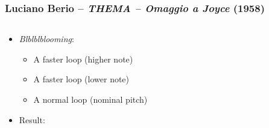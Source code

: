 \begin{frame}
    \frametitle{\normalsize Luciano Berio -- \emph{THEMA -- Omaggio a Joyce} (1958)} 

    \begin{columns}[T]
        \begin{column}{0.7\textwidth}
          \begin{itemize}
							\item \alert{\emph{Blblblblooming}:}
      
                  \begin{itemize}
											\item \alert{A faster loop (higher note)}
											\item \alert{A faster loop (lower note)}
											\item \alert{A normal loop (nominal pitch)}
                  \end{itemize}
      
					\item \alert{Result:} 
      
          \end{itemize}
        \end{column}
        \begin{column}{0.3\textwidth}
        \end{column}
    \end{columns}
        
\end{frame}
